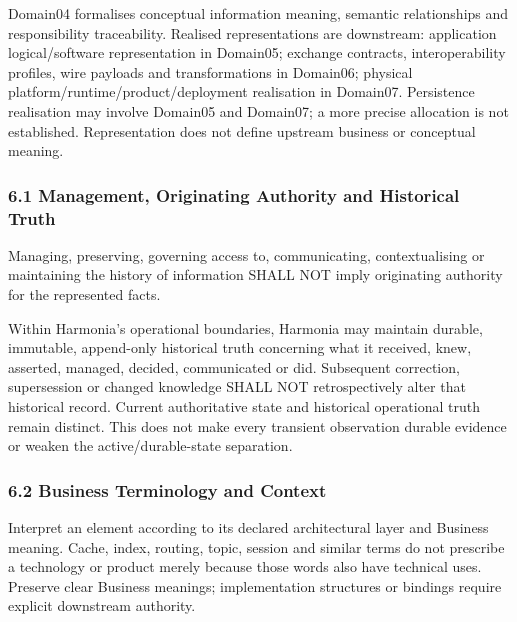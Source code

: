 Domain04 formalises conceptual information meaning, semantic relationships and responsibility traceability. Realised representations are downstream: application logical/\allowbreak{}software representation in Domain05; exchange contracts, interoperability profiles, wire payloads and transformations in Domain06; physical platform/\allowbreak{}runtime/\allowbreak{}product/\allowbreak{}deployment realisation in Domain07. Persistence realisation may involve Domain05 and Domain07; a more precise allocation is not established. Representation does not define upstream business or conceptual meaning.

\label{rad:metamodel:270}
\subsubsection*{6.1 Management, Originating Authority and Historical Truth}
\label{rad:metamodel:272}

Managing, preserving, governing access to, communicating, contextualising or maintaining the history of information SHALL NOT imply originating authority for the represented facts.

\label{rad:metamodel:274}

Within Harmonia's operational boundaries, Harmonia may maintain durable, immutable, append-only historical truth concerning what it received, knew, asserted, managed, decided, communicated or did. Subsequent correction, supersession or changed knowledge SHALL NOT retrospectively alter that historical record. Current authoritative state and historical operational truth remain distinct. This does not make every transient observation durable evidence or weaken the active/\allowbreak{}durable-state separation.

\label{rad:metamodel:276}
\subsubsection*{6.2 Business Terminology and Context}
\label{rad:metamodel:278}

Interpret an element according to its declared architectural layer and Business meaning. Cache, index, routing, topic, session and similar terms do not prescribe a technology or product merely because those words also have technical uses. Preserve clear Business meanings; implementation structures or bindings require explicit downstream authority.

\label{rad:metamodel:280}

